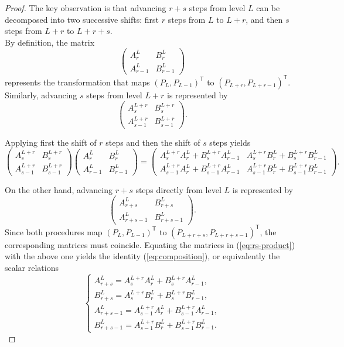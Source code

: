 \documentclass[11pt]{article}
\renewcommand\eqref[1]{(\ref{#1})} %
\theoremstyle{definition}
\theoremstyle{remark}
\numberwithin{equation}{section}
\begin{document}
\begin{proof}
The key observation is that advancing $r+s$ steps from level $L$ can be decomposed
into two successive shifts: first $r$ steps from $L$ to $L+r$, and then $s$ steps
from $L+r$ to $L+r+s$.\\

By definition, the matrix
\[
\begin{pmatrix}
A_r^L & B_r^L \\
A_{r-1}^L & B_{r-1}^L
\end{pmatrix}
\]
represents the transformation that maps $(P_L, P_{L-1})^{\mathsf T}$ to
$(P_{L+r}, P_{L+r-1})^{\mathsf T}$.
Similarly, advancing $s$ steps from level $L+r$ is represented by
\[
\begin{pmatrix}
A_s^{L+r} & B_s^{L+r} \\
A_{s-1}^{L+r} & B_{s-1}^{L+r}
\end{pmatrix}.
\]

Applying first the shift of $r$ steps and then the shift of $s$ steps yields
\begin{equation}\label{eq:rs-product}
\begin{pmatrix}
A_s^{L+r} & B_s^{L+r} \\
A_{s-1}^{L+r} & B_{s-1}^{L+r}
\end{pmatrix}
\begin{pmatrix}
A_r^L & B_r^L \\
A_{r-1}^L & B_{r-1}^L
\end{pmatrix}
=
\begin{pmatrix}
A_s^{L+r}A_r^L + B_s^{L+r}A_{r-1}^L &
A_s^{L+r}B_r^L + B_s^{L+r}B_{r-1}^L \\
A_{s-1}^{L+r}A_r^L + B_{s-1}^{L+r}A_{r-1}^L &
A_{s-1}^{L+r}B_r^L + B_{s-1}^{L+r}B_{r-1}^L
\end{pmatrix}.
\end{equation}

On the other hand, advancing $r+s$ steps directly from level $L$ is represented by
\[
\begin{pmatrix}
A_{r+s}^L & B_{r+s}^L \\
A_{r+s-1}^L & B_{r+s-1}^L
\end{pmatrix}.
\]
Since both procedures map $(P_L, P_{L-1})^{\mathsf T}$ to
$(P_{L+r+s}, P_{L+r+s-1})^{\mathsf T}$, the corresponding matrices must coincide.
Equating the matrices in \eqref{eq:rs-product} with the above one yields
the identity \eqref{eq:composition}, or equivalently the scalar relations
\[
\begin{cases}
A_{r+s}^L = A_s^{L+r}A_r^L + B_s^{L+r}A_{r-1}^L, \\[0.3em]
B_{r+s}^L = A_s^{L+r}B_r^L + B_s^{L+r}B_{r-1}^L, \\[0.3em]
A_{r+s-1}^L = A_{s-1}^{L+r}A_r^L + B_{s-1}^{L+r}A_{r-1}^L, \\[0.3em]
B_{r+s-1}^L = A_{s-1}^{L+r}B_r^L + B_{s-1}^{L+r}B_{r-1}^L.
\end{cases}
\]


\end{proof}
\end{document}
